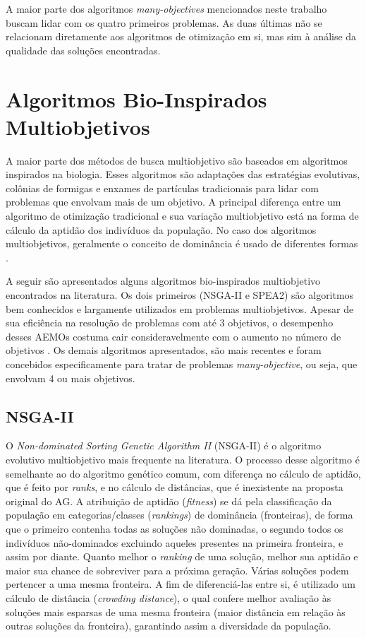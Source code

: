 A maior parte dos algoritmos \textit{many-objectives} mencionados neste trabalho buscam lidar com os quatro primeiros problemas. As duas últimas não se relacionam diretamente aos algoritmos de otimização em si, mas sim à análise da qualidade das soluções encontradas.

\section{Algoritmos Bio-Inspirados Multiobjetivos}
\label{section_bioinspired_algorithms}

A maior parte dos métodos de busca multiobjetivo são baseados em algoritmos inspirados na biologia. Esses algoritmos são adaptações das estratégias evolutivas, colônias de formigas e enxames de partículas tradicionais para lidar com problemas que envolvam mais de um objetivo. A principal diferença entre um algoritmo de otimização tradicional e sua variação multiobjetivo está na forma de cálculo da aptidão dos indivíduos da população. No caso dos algoritmos multiobjetivos, geralmente o conceito de dominância é usado de diferentes formas \cite{Bueno2010}.

A seguir são apresentados alguns algoritmos bio-inspirados multiobjetivo encontrados na literatura. Os dois primeiros (NSGA-II e SPEA2) são algoritmos bem conhecidos e largamente utilizados em problemas multiobjetivos. Apesar de sua eficiência na resolução de problemas com até 3 objetivos, o desempenho desses AEMOs costuma cair consideravelmente com o aumento no número de objetivos \cite{Franca2017}. Os demais algoritmos apresentados, são mais recentes e foram concebidos especificamente para tratar de problemas \textit{many-objective}, ou seja, que envolvam 4 ou mais objetivos.

\subsection{NSGA-II}
O \textit{Non-dominated Sorting Genetic Algorithm II} (NSGA-II) \cite{Deb2002} é o algoritmo evolutivo multiobjetivo mais frequente na literatura. O processo desse algoritmo é semelhante ao do algoritmo genético comum, com diferença no cálculo de aptidão, que é feito por \textit{ranks}, e no cálculo de distâncias, que é inexistente na proposta original do AG. A atribuição de aptidão (\textit{fitness}) se dá pela classificação da população em categorias/classes (\textit{rankings}) de dominância (fronteiras), de forma que o primeiro contenha todas as soluções não dominadas, o segundo todos os indivíduos não-dominados excluindo aqueles presentes na primeira fronteira, e assim por diante. Quanto melhor o \textit{ranking} de uma solução, melhor sua aptidão e  maior sua chance de sobreviver para a próxima geração. Várias soluções podem pertencer a uma mesma fronteira. A fim de diferenciá-las entre si, é utilizado um cálculo de distância (\textit{crowding distance}), o qual confere melhor avaliação às soluções mais esparsas de uma mesma fronteira (maior distância em relação às outras soluções da fronteira), garantindo assim a diversidade da população.

